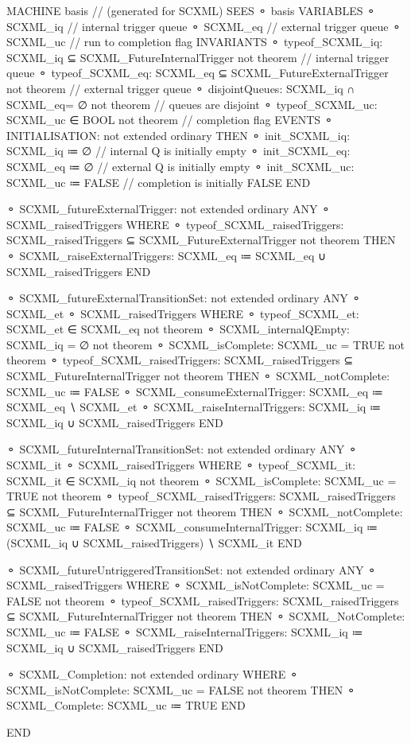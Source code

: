 \begin{EventBcode} 
MACHINE
		basis 	// (generated for SCXML)
	SEES
	⚬	 basis 
	VARIABLES
	⚬	SCXML_iq	 // internal trigger queue
	⚬	SCXML_eq	 // external trigger queue
	⚬	SCXML_uc	 // run to completion flag
	INVARIANTS
	⚬	typeof_SCXML_iq:	SCXML_iq ⊆ SCXML_FutureInternalTrigger not theorem // internal trigger queue
	⚬	typeof_SCXML_eq:	SCXML_eq ⊆ SCXML_FutureExternalTrigger not theorem // external trigger queue
	⚬	disjointQueues:	SCXML_iq ∩ SCXML_eq= ∅ not theorem // queues are disjoint
	⚬	typeof_SCXML_uc:	SCXML_uc ∈ BOOL not theorem // completion flag
	EVENTS
	⚬	INITIALISATION:	 not extended ordinary 
		THEN
		⚬	init_SCXML_iq:	SCXML_iq ≔ ∅ // internal Q is initially empty
		⚬	init_SCXML_eq:	SCXML_eq ≔ ∅ // external Q is initially empty
		⚬	init_SCXML_uc:	SCXML_uc ≔ FALSE // completion is initially FALSE
		END

	⚬	SCXML_futureExternalTrigger:	 not extended ordinary 
		ANY
		⚬	SCXML_raisedTriggers	 
		WHERE
		⚬	typeof_SCXML_raisedTriggers:	SCXML_raisedTriggers ⊆ SCXML_FutureExternalTrigger not theorem 
		THEN
		⚬	SCXML_raiseExternalTriggers:	SCXML_eq ≔ SCXML_eq ∪ SCXML_raisedTriggers 
		END

	⚬	SCXML_futureExternalTransitionSet:	 not extended ordinary 
		ANY
		⚬	SCXML_et	 
		⚬	SCXML_raisedTriggers	 
		WHERE
		⚬	typeof_SCXML_et:	SCXML_et ∈ SCXML_eq not theorem 
		⚬	SCXML_internalQEmpty:	SCXML_iq = ∅ not theorem 
		⚬	SCXML_isComplete:	SCXML_uc = TRUE not theorem 
		⚬	typeof_SCXML_raisedTriggers:	SCXML_raisedTriggers ⊆ SCXML_FutureInternalTrigger not theorem 
		THEN
		⚬	SCXML_notComplete:	SCXML_uc ≔ FALSE 
		⚬	SCXML_consumeExternalTrigger:	SCXML_eq ≔ SCXML_eq ∖ {SCXML_et} 
		⚬	SCXML_raiseInternalTriggers:	SCXML_iq ≔ SCXML_iq ∪ SCXML_raisedTriggers 
		END

	⚬	SCXML_futureInternalTransitionSet:	 not extended ordinary 
		ANY
		⚬	SCXML_it	 
		⚬	SCXML_raisedTriggers	 
		WHERE
		⚬	typeof_SCXML_it:	SCXML_it  ∈ SCXML_iq not theorem 
		⚬	SCXML_isComplete:	SCXML_uc = TRUE not theorem 
		⚬	typeof_SCXML_raisedTriggers:	SCXML_raisedTriggers ⊆ SCXML_FutureInternalTrigger not theorem 
		THEN
		⚬	SCXML_notComplete:	SCXML_uc ≔ FALSE 
		⚬	SCXML_consumeInternalTrigger:	SCXML_iq ≔ (SCXML_iq ∪ SCXML_raisedTriggers) ∖ {SCXML_it} 
		END

	⚬	SCXML_futureUntriggeredTransitionSet:	 not extended ordinary 
		ANY
		⚬	SCXML_raisedTriggers	 
		WHERE
		⚬	SCXML_isNotComplete:	SCXML_uc = FALSE not theorem 
		⚬	typeof_SCXML_raisedTriggers:	SCXML_raisedTriggers ⊆ SCXML_FutureInternalTrigger not theorem 
		THEN
		⚬	SCXML_NotComplete:	SCXML_uc ≔ FALSE 
		⚬	SCXML_raiseInternalTriggers:	SCXML_iq ≔ SCXML_iq ∪ SCXML_raisedTriggers 
		END

	⚬	SCXML_Completion:	 not extended ordinary 
		WHERE
		⚬	SCXML_isNotComplete:	SCXML_uc = FALSE not theorem 
		THEN
		⚬	SCXML_Complete:	SCXML_uc ≔ TRUE 
		END

	END
\end{EventBcode}



